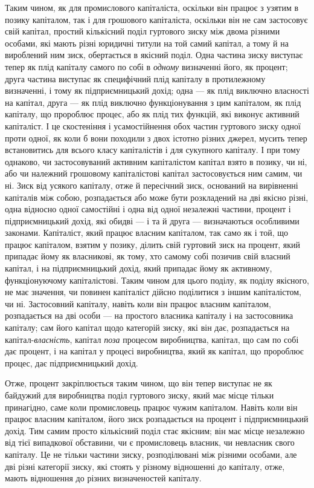Таким чином, як для промислового капіталіста, оскільки він
працює з узятим в позику капіталом, так і для грошового капіталіста,
оскільки він не сам застосовує свій капітал, простий
кількісний поділ гуртового зиску між двома різними особами,
які мають різні юридичні титули на той самий капітал, а тому
й на вироблений ним зиск, обертається в якісний поділ. Одна
частина зиску виступає тепер як плід капіталу самого по собі
в \emph{одному} визначенні його, як процент; друга частина виступає
як специфічний плід капіталу в протилежному визначенні, і
тому як підприємницький дохід; одна — як плід виключно власності
на капітал, друга — як плід виключно функціонування
з цим капіталом, як плід капіталу, що пророблює процес,
або як плід тих функцій, які виконує активний капіталіст. І це
скостеніння і усамостійнення обох частин гуртового зиску одної
проти одної, як коли б вони походили з двох істотно різних
джерел, мусить тепер встановитись для всього класу капіталістів
і для сукупного капіталу. І при тому однаково, чи застосовуваний
активним капіталістом капітал взято в позику, чи ні, або
чи належний грошовому капіталістові капітал застосовується
ним самим, чи ні. Зиск від усякого капіталу, отже й пересічний
зиск, оснований на вирівненні капіталів між собою, розпадається
або може бути розкладений на дві якісно різні, одна відносно
одної самостійні і одна від одної незалежні частини, процент
і підприємницький дохід, які обидві — і та й друга — визначаються
особливими законами. Капіталіст, який працює власним
капіталом, так само як і той, що працює капіталом,
взятим у позику, ділить свій гуртовий зиск на процент, який
припадає йому як власникові, як тому, хто самому собі позичив
свій власний капітал, і на підприємницький дохід, який припадає
йому як активному, функціонуючому капіталістові. Таким чином
для цього поділу, як поділу якісного, не має значення, чи повинен
капіталіст дійсно поділитися з іншим капіталістом, чи ні.
Застосовний капіталу, навіть коли він працює власним капіталом,
розпадається на дві особи — на простого власника капіталу
і на застосовника капіталу; сам його капітал щодо категорій
зиску, які він дає, розпадається на капітал-\emph{власність}, капітал
\emph{поза} процесом виробництва, капітал, що сам по собі дає процент,
і на капітал у процесі виробництва, який як капітал, що
пророблює процес, дає підприємницький дохід.

Отже, процент закріплюється таким чином, що він тепер виступає
не як байдужий для виробництва поділ гуртового зиску,
який має місце тільки принагідно, саме коли промисловець працює
чужим капіталом. Навіть коли він працює власним капіталом,
його зиск розпадається на процент і підприємницький
дохід. Тим самим просто кількісний поділ стає якісним; він має
місце незалежно від тієї випадкової обставини, чи є промисловець
власник, чи невласник свого капіталу. Це не тільки частини
зиску, розподілювані між різними особами, але дві різні
категорії зиску, які стоять у різному відношенні до капіталу,
отже, мають відношення до різних визначеностей капіталу.
